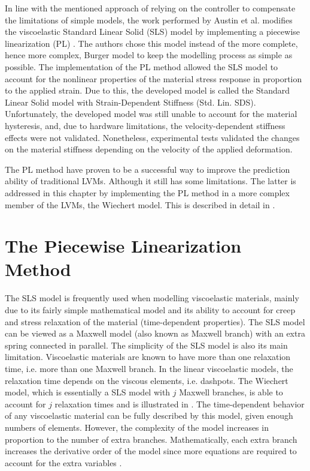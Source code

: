 In line with the mentioned approach of relying on the controller to compensate the limitations of simple models, the work performed by Austin et al. modifies the viscoelastic Standard Linear Solid (SLS) model by implementing a piecewise linearization (PL) \cite{austin2015control}. The authors chose this model instead of the more complete, hence more complex, Burger model to keep the modelling process as simple as possible. The implementation of the PL method allowed the SLS model to account for the nonlinear properties of the material stress response in proportion to the applied strain. Due to this, the developed model is called the Standard Linear Solid model with Strain-Dependent Stiffness (Std. Lin. SDS). Unfortunately, the developed model was still unable to account for the material hysteresis, and, due to hardware limitations, the velocity-dependent stiffness effects were not validated. Nonetheless, experimental tests validated the changes on the material stiffness depending on the velocity of the applied deformation.

The PL method have proven to be a successful way to improve the prediction ability of traditional LVMs. Although it still has some limitations. The latter is addressed in this chapter by implementing the PL method in a more complex member of the LVMs, the Wiechert model. This is described in detail in .

\section{The Piecewise Linearization Method} \label{sec:wiechert}

The SLS model is frequently used when modelling viscoelastic materials, mainly due to its fairly simple mathematical model and its ability to account for creep and stress relaxation of the material (time-dependent properties). The SLS model can be viewed as a Maxwell model (also known as Maxwell branch) with an extra spring connected in parallel. The simplicity of the SLS model is also its main limitation. 
Viscoelastic materials are known to have more than one relaxation time, i.e. more than one Maxwell branch. In the linear viscoelastic models, the relaxation time depends on the viscous elements, i.e. dashpots. The Wiechert model, which is essentially a SLS model with $j$ Maxwell branches, is able to account for $j$ relaxation times and is illustrated in . The time-dependent behavior of any viscoelastic material can be fully described by this model, given enough numbers of elements. However, the complexity of the model increases in proportion to the number of extra branches. Mathematically, each extra branch increases the derivative order of the model since more equations are required to account for the extra variables \cite{tirella2014strain,roylance2001engineering}.

